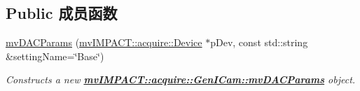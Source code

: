 \subsection*{Public 成员函数}
\begin{DoxyCompactItemize}
\item 
\hyperlink{classmv_i_m_p_a_c_t_1_1acquire_1_1_gen_i_cam_1_1mv_d_a_c_params_afc7d710822012c98a743cea2ebe5e934}{mv\+D\+A\+C\+Params} (\hyperlink{classmv_i_m_p_a_c_t_1_1acquire_1_1_device}{mv\+I\+M\+P\+A\+C\+T\+::acquire\+::\+Device} $\ast$p\+Dev, const std\+::string \&setting\+Name=\char`\"{}Base\char`\"{})
\begin{DoxyCompactList}\small\item\em Constructs a new {\bfseries \hyperlink{classmv_i_m_p_a_c_t_1_1acquire_1_1_gen_i_cam_1_1mv_d_a_c_params}{mv\+I\+M\+P\+A\+C\+T\+::acquire\+::\+Gen\+I\+Cam\+::mv\+D\+A\+C\+Params}} object. \end{DoxyCompactList}\end{DoxyCompactItemize}
